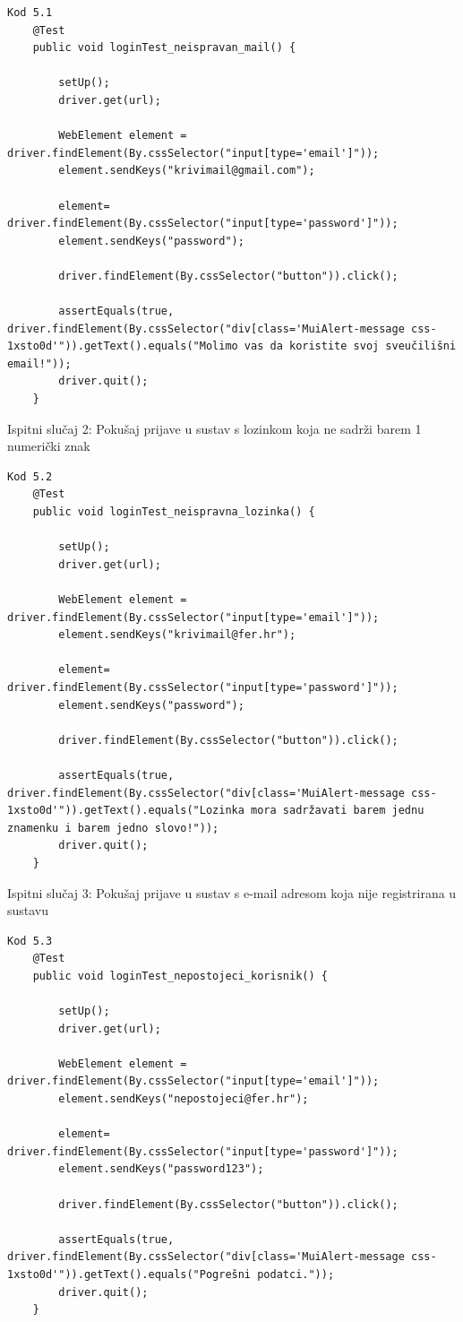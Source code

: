 \begin{verbatim}Kod 5.1
	@Test
	public void loginTest_neispravan_mail() {

		setUp();
		driver.get(url);

		WebElement element = driver.findElement(By.cssSelector("input[type='email']")); 
		element.sendKeys("krivimail@gmail.com");

		element= driver.findElement(By.cssSelector("input[type='password']")); 
		element.sendKeys("password");

		driver.findElement(By.cssSelector("button")).click();

		assertEquals(true, driver.findElement(By.cssSelector("div[class='MuiAlert-message css-1xsto0d'")).getText().equals("Molimo vas da koristite svoj sveučilišni email!"));
		driver.quit();
	}
\end{verbatim}

Ispitni slučaj 2: Pokušaj prijave u sustav s lozinkom koja ne sadrži barem 1 numerički znak
\begin{verbatim}Kod 5.2
	@Test
	public void loginTest_neispravna_lozinka() {

		setUp();
		driver.get(url);

		WebElement element = driver.findElement(By.cssSelector("input[type='email']")); 
		element.sendKeys("krivimail@fer.hr");

		element= driver.findElement(By.cssSelector("input[type='password']")); 
		element.sendKeys("password");

		driver.findElement(By.cssSelector("button")).click();

		assertEquals(true, driver.findElement(By.cssSelector("div[class='MuiAlert-message css-1xsto0d'")).getText().equals("Lozinka mora sadržavati barem jednu znamenku i barem jedno slovo!"));
		driver.quit();
	}
\end{verbatim}

Ispitni slučaj 3: Pokušaj prijave u sustav s e-mail adresom koja nije registrirana u sustavu
\begin{verbatim}Kod 5.3
	@Test
	public void loginTest_nepostojeci_korisnik() {

		setUp();
		driver.get(url);

		WebElement element = driver.findElement(By.cssSelector("input[type='email']")); 
		element.sendKeys("nepostojeci@fer.hr");

		element= driver.findElement(By.cssSelector("input[type='password']")); 
		element.sendKeys("password123");

		driver.findElement(By.cssSelector("button")).click();

		assertEquals(true, driver.findElement(By.cssSelector("div[class='MuiAlert-message css-1xsto0d'")).getText().equals("Pogrešni podatci."));
		driver.quit();
	}

\end{verbatim}

